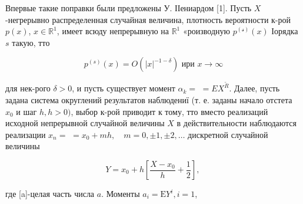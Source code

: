 \documentclass[10pt]{article}
\begin{document}
Впервые такие поправки были предложены У. ІІениардом [1]. Пусть $X$-негрерывно распределенная случайная величина, плотность вероятности к-рой $p(x)$, $x \in \mathbb{R}^{1}$, имеет всюду непрерывную на $\mathbb{R}^{1}$ «роизводную $p^{(\mathcal{s})}(x)$ Іорядка $s$ такую, тто



\[

p^{(s)}(x)=O\left(|x|^{-1-\delta}\right) \text { ири } x \rightarrow \infty

\]



для нек-рого $\delta>0$, и пусть существует момент $\alpha_{k}=$ $=E X^{\tilde{R}}$. Далее, пусть задана система округлений результатов наблюдениї (т. е. заданы начало отстета $x_{0}$ и шаг $h, h>0)$, выбор к-рой приводит к тому, тто вместо реализаций исходной непрерывной случайной величины $X$ в действительности наблюдаются реализации $x_{n}=$ $=x_{0}+m h, \quad m=0, \pm 1, \pm 2, \ldots$ дискретной случайной величины



\[

Y=x_{0}+h\left[\frac{X-x_{0}}{h}+\frac{1}{2}\right] \text {, }

\]



где [a]-целая часть числа $a$. Моменты $a_{i}=\mathrm{E} Y^{i}, i=1$,
\end{document}
